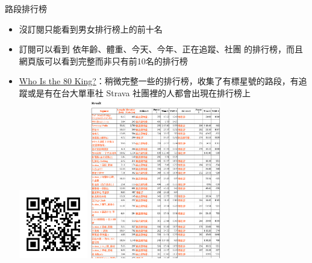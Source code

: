 \begin{frame}{路段排行榜}
\begin{multicols}{2}
\begin{itemize}
\item 沒訂閱只能看到男女排行榜上的前十名\pause
\item 訂閱可以看到 依年齡、體重、今天、今年、正在追蹤、社團 的排行榜，而且網頁版可以看到完整而非只有前10名的排行榜\pause
\item \href{http://ws1.csie.ntu.edu.tw:9480}{Who Is the 80 King?}：稍微完整一些的排行榜，收集了有標星號的路段，有追蹤或是有在台大單車社 Strava 社團裡的人都會出現在排行榜上\\
\includegraphics[height=3cm]{80KingQRCode.png}
\newpage
\includegraphics[height=7cm]{80King.png}
\end{itemize}
\end{multicols}
\end{frame}

